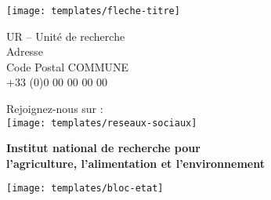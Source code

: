 
\thispagestyle{empty}


\begin{center}

\color{inrae}

\vspace*{10cm}

\texttt{[image: templates/fleche-titre]}\par

\sffamily
UR -- Unité de recherche\\
Adresse\\
Code Postal COMMUNE\\
+33 (0)0 00 00 00 00\par\bigskip

Rejoignez-nous sur :\\
\texttt{[image: templates/reseaux-sociaux]}\par\bigskip

\vspace*{2cm}

{\bfseries Institut national de recherche pour\\
l'agriculture, l'alimentation et l'environnement}\par\bigskip

\texttt{[image: templates/bloc-etat]}\par

\end{center}

\restoregeometry
